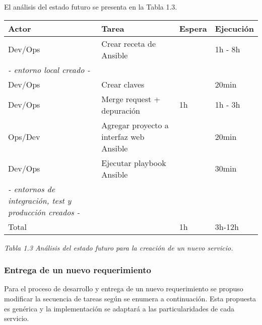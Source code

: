 El análisis del estado futuro se presenta en la Tabla 1.3.

\begin{tabular}{|l|l|l|l|}
\hline
Actor & Tarea & Espera & Ejecución \\ \hline
Dev/Ops & Crear receta de Ansible &  & 1h - 8h \\ \hline
\textit{- entorno local creado -} &  &  &  \\ \hline
Dev/Ops & Crear claves &  & 20min \\ \hline
Dev/Ops & Merge request + depuración & 1h & 1h - 3h  \\ \hline
Ops/Dev & Agregar proyecto a interfaz web Ansible &  & 20min \\ \hline
Dev/Ops & Ejecutar playbook Ansible &  & 30min \\ \hline
\textit{- entornos de integración, test y producción creados -} &  &  &  \\ \hline
Total &  & 1h & 3h-12h \\ \hline
\end{tabular}
\textit{Tabla 1.3 Análisis del estado futuro para la creación de un nuevo servicio.}

\subsubsection{Entrega de un nuevo requerimiento}

Para el proceso de desarrollo y entrega de un nuevo requerimiento se  propuso modificar la secuencia de tareas según se enumera a continuación. Esta propuesta es genérica y la implementación se adaptará a las particularidades de cada servicio.

